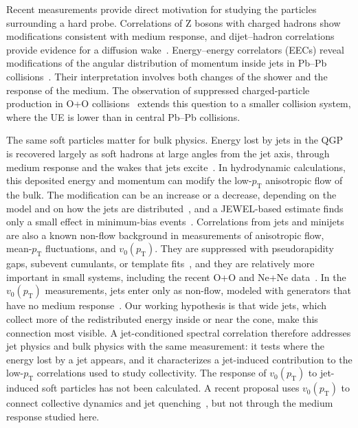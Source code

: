 \documentclass[aps,prc,twocolumn,superscriptaddress,nofootinbib,longbibliography,floatfix,10pt]{revtex4-2}
\newcommand{\pT}{p_{\mathrm T}}
\begin{document}
Recent measurements provide direct motivation for studying the particles surrounding a hard probe. Correlations of Z bosons with charged hadrons show modifications consistent with medium response, and dijet--hadron correlations provide evidence for a diffusion wake~\cite{CMSZ,CMSWake}. Energy--energy correlators (EECs) reveal modifications of the angular distribution of momentum inside jets in Pb--Pb collisions~\cite{CMSEEC}. Their interpretation involves both changes of the shower and the response of the medium. The observation of suppressed charged-particle production in O+O collisions~\cite{CMSOO} extends this question to a smaller collision system, where the UE is lower than in central Pb--Pb collisions.

The same soft particles matter for bulk physics. Energy lost by jets in the QGP is recovered largely as soft hadrons at large angles from the jet axis, through medium response and the wakes that jets excite~\cite{TachibanaJetFlow,CMS:2015hkr,Casalderrey-Solana:2016jvj,KudinoorWideJetWake}. In hydrodynamic calculations, this deposited energy and momentum can modify the low-$\pT$ anisotropic flow of the bulk. The modification can be an increase or a decrease, depending on the model and on how the jets are distributed~\cite{AndradeJetFlow,SchulcTomasikFlow,OkaiMinijet,PablosMinijet}, and a JEWEL-based estimate finds only a small effect in minimum-bias events~\cite{FloerchingerZappJets}. Correlations from jets and minijets are also a known non-flow background in measurements of anisotropic flow, mean-$\pT$ fluctuations, and $v_0(\pT)$. They are suppressed with pseudorapidity gaps, subevent cumulants, or template fits~\cite{JiaSubevent,ATLASSubevent,ATLASTemplatePRC,ALICEmeanptSystem,ATLASv0,ALICEv0}, and they are relatively more important in small systems, including the recent O+O and Ne+Ne data~\cite{LimNonflow,HuoNonflow,ATLASOOflow,CMSOOflow,LimNagleRhoOO}. In the $v_0(\pT)$ measurements, jets enter only as non-flow, modeled with generators that have no medium response~\cite{ATLASv0,ALICEv0}. Our working hypothesis is that wide jets, which collect more of the redistributed energy inside or near the cone, make this connection most visible. A jet-conditioned spectral correlation therefore addresses jet physics and bulk physics with the same measurement: it tests where the energy lost by a jet appears, and it characterizes a jet-induced contribution to the low-$\pT$ correlations used to study collectivity. The response of $v_0(\pT)$ to jet-induced soft particles has not been calculated. A recent proposal uses $v_0(\pT)$ to connect collective dynamics and jet quenching~\cite{DuJacobsV0}, but not through the medium response studied here.
\end{document}
